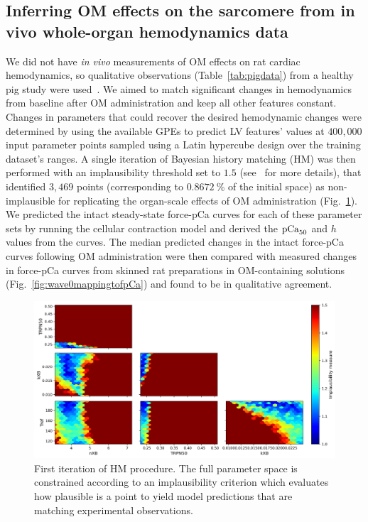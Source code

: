 \subsection{Inferring OM effects on the sarcomere from in vivo whole-organ hemodynamics data}\label{ch5caseone}
We did not have \textit{in vivo} measurements of OM effects on rat cardiac hemodynamics, so qualitative observations (Table~\ref{tab:pigdata}) from a healthy pig study were used~\cite{Bakkehaug:2015}. We aimed to match significant changes in hemodynamics from baseline after OM administration and keep all other features constant. Changes in parameters that could recover the desired hemodynamic changes were determined by using the available GPEs to predict LV features' values at $400,000$ input parameter points sampled using a Latin hypercube design over the training dataset's ranges. A single iteration of Bayesian history matching (HM) was then performed with an implausibility threshold set to $1.5$ (see~\cite{Longobardi:2020} for more details), that identified $3,469$ points (corresponding to $\SI{0.8672}{\percent}$ of the initial space) as non-implausible for replicating the organ-scale effects of OM administration (Fig.~\ref{fig:wave0}). We predicted the intact steady-state force-pCa curves for each of these parameter sets by running the cellular contraction model and derived the $\textrm{pCa}_{50}$ and $h$ values from the curves. The median predicted changes in the intact force-pCa curves following OM administration were then compared with measured \cite{Nagy:2015, Kampourakis:2018, Kieu:2019} changes in force-pCa curves from skinned rat preparations in OM-containing solutions (Fig.~\ref{fig:wave0mappingtofpCa}) and found to be in qualitative agreement. 



\begin{figure}[!ht]
    \myfloatalign
    \includegraphics[width=\textwidth]{figures/chapter05/Fig1.png}
    \caption{First iteration of HM procedure. The full parameter space is constrained according to an implausibility criterion which evaluates how plausible is a point to yield model predictions that are matching experimental observations.}
    \label{fig:wave0}
\end{figure}

